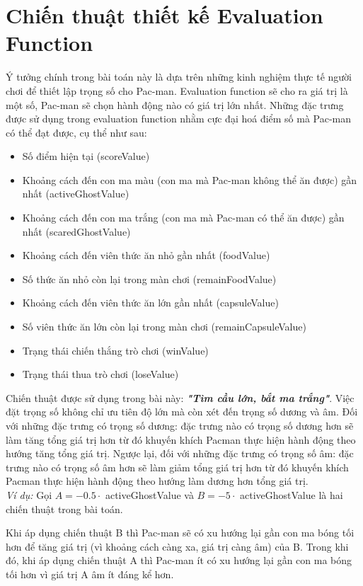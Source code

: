\documentclass[12pt, a4paper]{article}
\begin{document}
\section{Chiến thuật thiết kế Evaluation Function}
Ý tưởng chính trong bài toán này là dựa trên những kinh nghiệm thực tế người chơi để thiết lập trọng số cho Pac-man. Evaluation function sẽ cho ra giá trị là một số, Pac-man sẽ chọn hành động nào có giá trị lớn nhất. Những đặc trưng được sử dụng trong evaluation function nhằm cực đại hoá điểm số mà Pac-man có thể đạt được, cụ thể như sau:
\begin{itemize}
    \item Số điểm hiện tại (scoreValue)
    \item Khoảng cách đến con ma màu (con ma mà Pac-man không thể ăn được) gần nhất (activeGhostValue)
    \item Khoảng cách đến con ma trắng (con ma mà Pac-man có thể ăn được) gần nhất (scaredGhostValue)
    \item Khoảng cách đến viên thức ăn nhỏ gần nhất (foodValue)
    \item Số thức ăn nhỏ còn lại trong màn chơi (remainFoodValue)
    \item Khoảng cách đến viên thức ăn lớn gần nhất (capsuleValue)
    \item Số viên thức ăn lớn còn lại trong màn chơi (remainCapsuleValue)
    \item Trạng thái chiến thắng trò chơi (winValue)
    \item Trạng thái thua trò chơi (loseValue)
\end{itemize}
Chiến thuật được sử dụng trong bài này: \textbf{\textit{"Tìm cầu lớn, bắt ma trắng"}}. Việc đặt trọng số không chỉ ưu tiên độ lớn mà còn xét đến trọng số dương và âm. Đối với những đặc trưng có trọng số dương: đặc trưng nào có trọng số dương hơn sẽ làm tăng tổng giá trị hơn từ đó khuyến khích Pacman thực hiện hành động theo hướng tăng tổng giá trị. Ngược lại, đối với những đặc trưng có trọng số âm: đặc trưng nào có trọng số âm hơn sẽ làm giảm tổng giá trị hơn từ đó khuyến khích Pacman thực hiện hành động theo hướng làm dương hơn tổng giá trị.\\
\textit{Ví dụ:} Gọi $A = -0.5 \cdot$ activeGhostValue và $ B =-5 \cdot$ activeGhostValue là hai chiến thuật trong bài toán. \par Khi áp dụng chiến thuật B thì Pac-man sẽ có xu hướng lại gần con ma bóng tối hơn để tăng giá trị (vì khoảng cách càng xa, giá trị càng âm) của B. Trong khi đó, khi áp dụng chiến thuật A thì Pac-man ít có xu hướng lại gần con ma bóng tối hơn vì giá trị A âm ít đáng kể hơn.\\\par
\end{document}
